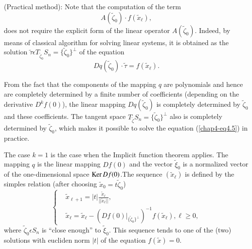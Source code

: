 \begin{remark}\label{chap4-rem4.3}
(Practical method): Note that the computation of the term 
$$
A(\widetilde{\zeta}_{0}) \cdot f(\widetilde{x}_{\ell}),
$$
does not require the explicit form of the linear operator
$A(\widetilde{\zeta}_{0})$. Indeed, by means of classical algorithm
for solving linear systems, it is obtained as the solution
$\widetilde{\tau} \epsilon T_{\widetilde{\zeta}_{0}} S_{n} =
\{\widetilde{\zeta}_{0}\}^{\perp}$ of the equation
\begin{equation*}
Dq(\widetilde{\zeta}_{0}) \cdot \widetilde{\tau} = f(\widetilde{x}_{\ell}).\tag{4.5}\label{chap4-eq4.5}
\end{equation*}

From the fact that the components of the mapping $q$ are polynomials and
hence are completely determined by a finite number of coefficients
(depending on the derivative $D^{k}f(0)$), the linear mapping
$Dq(\widetilde{\zeta}_{0})$ is completely determined by
$\widetilde{\zeta}_{0}$ and these coefficients. The tangent space
$T_{\widetilde{\zeta}}S_{n} = \{\widetilde{\zeta}_{0}\}^{\perp}$ also
is completely determined by $\widetilde{\zeta}_{0}$, which makes it
possible to solve the equation (\ref{chap4-eq4.5}) in practice.
\end{remark}

\begin{remark}\label{chap4-rem4.4}
The case $k = 1$ is the case when the Implicit function theorem
applies. The mapping $q$ is the linear mapping $Df(0)$ and the vector
$\widetilde{\xi}_{0}$ is a normalized vector of the one-dimensional
space $\operatorname{Ker} Df(0)$.\pageoriginale The sequence $(\widetilde{x}_{\ell})$
is defined by the simples relation (after choosing $\widetilde{x}_{0}
= t\widetilde{\zeta}_{0}$)
\begin{equation*}
\begin{cases}
& \widetilde{x}_{\ell + 1} = |t|
  \frac{\widetilde{x}_{\ell}}{||\widetilde{x}_{\ell}||},\\
& \widetilde{x}_{\ell} = \widetilde{x}_{\ell} - (Df(0)
  |_{\{\widetilde{\zeta}_{0}\}^{\perp}})^{-1} f(\widetilde{x}_{\ell}),
  \ell \geq 0,
\end{cases}
\end{equation*}
where $\widetilde{\zeta}_{0} \epsilon S_{n}$ is ``close enough'' to
$\widetilde{\xi}_{0}$. This sequence tends to one of the (two)
solutions with eucliden norm $|t|$ of the equation $f(\widetilde{x}) =
0$.
\end{remark}

